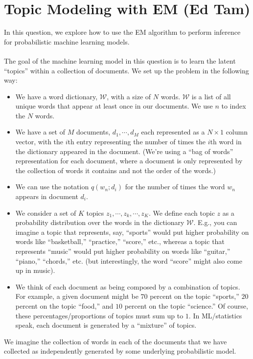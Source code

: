 \documentclass{exam}
\begin{document}
\section{Topic Modeling with EM (Ed Tam)}
In this question, we explore how to use the EM algorithm to perform inference for probabilistic machine learning models. 
\\\\
The goal of the machine learning model in this question is to learn the latent ``topics'' within a collection of documents. We set up the problem in the following way: 
\begin{itemize}
    \item We have a word dictionary, $\mathcal{W}$, with a size of $N$ words. $\mathcal{W}$ is a list of all unique words that appear at least once in our documents. We use $n$ to index the $N$ words. 
    \item We have a set of $M$ documents, $d_1, \cdots, d_M$ each represented as a $N \times 1$ column vector, with the $i$th entry representing the number of times the  $i$th word in the dictionary appeared in the document. (We're using a ``bag of words'' representation for each document, where a document is only represented by the collection of words it contains and not the order of the words.)
    \item  We can use the notation $q(w_n; d_i)$ for the number of times the word $w_n$ appears in document $d_i$.
    \item We consider a set of $K$ topics $z_1, \cdots, z_k, \cdots, z_K$. We define each topic $z$ as a probability distribution over the words in the dictionary $\mathcal{W}$. E.g., you can imagine a topic that represents, say, ``sports'' would put higher probability on words like ``basketball,'' ``practice,'' ``score,'' etc., whereas a topic that represents ``music'' would put higher probability on words like ``guitar,'' ``piano,'' ``chords,'' etc. (but interestingly, the word ``score'' might also come up in music).
    \item We think of each document as being composed by a combination of topics. For example, a given document might be $70$ percent on the topic ``sports,'' $20$ percent on the topic ``food,'' and $10$ percent on the topic ``science.'' Of course, these percentages/proportions of topics must sum up to $1$. In ML/statistics speak, each document is generated by a ``mixture'' of topics. 
\end{itemize}
We imagine the collection of words in each of the documents that we have collected as independently generated by some underlying probabilistic model. 
\end{document}
